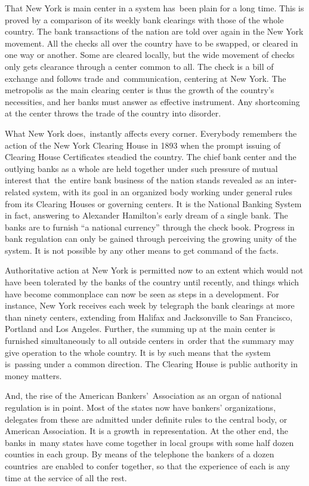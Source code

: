 \documentclass[twoside,symmetric,nobib,justified]{tufte-book}
\begin{document}
That New York is main center in a system has~been plain for a long time.
This is proved by a comparison of its weekly bank clearings with those
of the whole country. The bank transactions of the nation are told over
again in the New York movement. All the checks all over the country have
to be swapped, or cleared in one way or another. Some are cleared
locally, but the wide movement of checks only gets clearance through a
center common to all. The check is a bill of exchange and follows trade
and~communication, centering at New York. The metropolis as the main
clearing center is thus the growth of the country's necessities, and her
banks must answer as effective instrument. Any shortcoming at the center
throws the trade of the country into disorder. ~

What New York does,~instantly affects every corner. Everybody remembers
the action of the New York Clearing House in 1893 when the prompt
issuing of Clearing House Certificates steadied the country. The chief
bank center and the outlying banks as a whole are held together under
such pressure of mutual interest that~the~entire bank business of the
nation stands revealed as an inter-related system, with its goal in an
organized body working under general rules from its Clearing Houses or
governing centers. It is the National Banking System in fact, answering
to Alexander Hamilton's early dream of a single bank. The banks are to
furnish ``a national currency'' through the check book. Progress in bank
regulation can only be gained through perceiving the growing unity of
the system. It is not possible by any other means to get command of the
facts.~

\newpage Authoritative action at New York is permitted now to an extent which
would not have been tolerated by the banks of the country until
recently, and things which have become commonplace can now be seen as
steps in a development. For instance, New York receives each week by
telegraph the bank clearings at more than ninety centers, extending from
Halifax and Jacksonville to San Francisco, Portland and Los Angeles.
Further, the summing up at the main center is furnished simultaneously
to all outside centers in~order that the summary may give operation to
the whole country. It is by such means that the system is~passing under
a common direction. The Clearing House is public authority in money
matters.~~

And, the rise of the American Bankers'~Association as an organ of
national regulation is in point. Most of the states now have bankers'
organizations, delegates from these are admitted under definite rules to
the central body, or American Association. It is a growth~in
representation. At the other end, the banks in~many states have come
together in local groups with some half dozen counties in each group. By
means of the telephone the bankers of a dozen countries~are enabled to
confer together, so that the experience of each is any time at the
service of all the rest.
\end{document}
